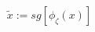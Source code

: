 \documentclass[preview]{standalone}
\begin{document}
\begin{align*}
\tilde x := sg[\phi_\zeta (x)]
\end{align*}
\end{document}
